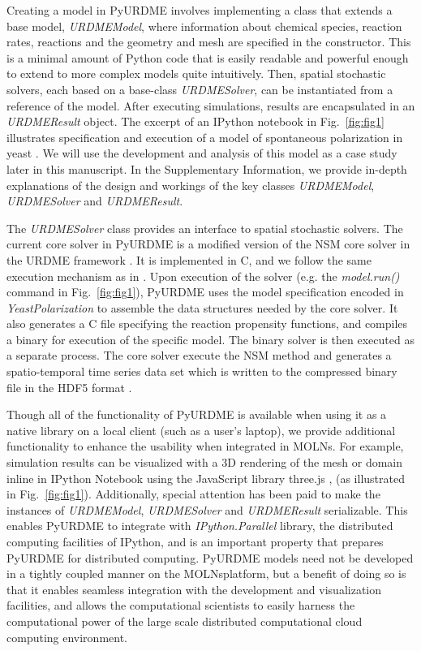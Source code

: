 \documentclass[final,leqno,onefignum,onetabnum]{siamltex1213}
\def\packagename {MOLNs}
\begin{document}
Creating a model in PyURDME involves implementing a class that extends a base model, \emph{URDMEModel}, where information about chemical species, reaction rates, reactions and the geometry and mesh are specified in the constructor. This is a minimal amount of Python code that is easily readable and powerful enough to extend to more complex models quite intuitively. Then, spatial stochastic solvers, each based on a base-class \emph{URDMESolver}, can be instantiated from  a reference of the model. After executing simulations, results are encapsulated in an \emph{URDMEResult} object. The excerpt of an IPython notebook \cite{ipython} in Fig.~\ref{fig:fig1} illustrates specification and execution of a model of spontaneous polarization in yeast \cite{Altschuler2008}. We will use the development and analysis of this model as a case study later in this manuscript.
In the Supplementary Information, we provide in-depth explanations of the design and workings of the key classes \emph{URDMEModel}, \emph{URDMESolver} and \emph{URDMEResult}.

The \emph{URDMESolver} class provides an interface to spatial stochastic solvers.  The current core solver in PyURDME is a modified version of the NSM \cite{NSM} core solver in the URDME framework \cite{urdme}. It is implemented in C, and we follow the same execution mechanism as in \cite{urdme}.  Upon execution of the solver (e.g. the \emph{model.run()} command in Fig.~\ref{fig:fig1}), PyURDME uses the model specification encoded in \emph{YeastPolarization} to assemble the data structures needed by the core solver. It also generates a C file specifying the reaction propensity functions, and compiles a binary for execution of the specific model. The binary solver is then executed as a separate process.
The core solver execute the NSM method and generates a spatio-temporal time series data set which is written to the compressed binary file in the HDF5 format \cite{hdf5}. 

Though all of the functionality of PyURDME is available when using it as a native library on a local client (such as a user's laptop), we provide additional functionality to enhance the usability when integrated in \packagename. For example, simulation results can be visualized with a 3D rendering of the mesh or domain inline in IPython Notebook using the JavaScript library three.js \cite{ThreeJS}, (as illustrated in Fig.~\ref{fig:fig1}). Additionally, special attention has been paid to make the instances of \emph{URDMEModel}, \emph{URDMESolver} and \emph{URDMEResult} serializable.  This enables PyURDME to integrate with \emph{IPython.Parallel} library, the distributed computing facilities of IPython, and is an important property that prepares PyURDME for distributed computing. PyURDME models need not be developed in a tightly coupled manner on the \packagename platform, but a benefit of doing so is that it enables seamless integration with the development and visualization facilities, and allows the computational scientists to easily harness the computational power of the large scale distributed computational cloud computing environment.  
 
\end{document}
